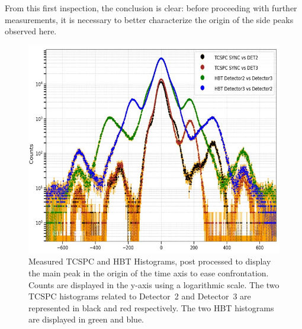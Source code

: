 From this first inspection, the conclusion is clear: before proceeding with further measurements, it is necessary to better characterize the origin of the side peaks observed here.

\begin{figure}[hbtp]
\centering
\includegraphics[width=1\textwidth]{Khaos.jpg}
\caption{Measured TCSPC and HBT Histograms, post processed to display the main peak in the origin of the time axis to ease confrontation. Counts are displayed in the y-axis using a logarithmic scale. The two TCSPC histograms related to Detector~2 and Detector~3 are represented in black and red respectively. The two HBT histograms are displayed in green and blue.}
\label{Khaos}
\end{figure}

